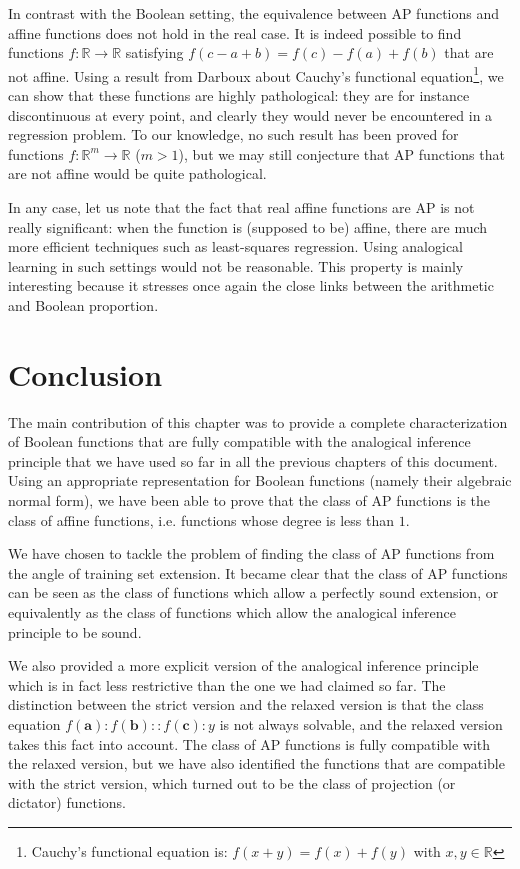 In contrast with the Boolean setting, the equivalence between AP functions and
affine functions does not hold in the real case. It is indeed possible to find
functions $f: \mathbb{R} \to \mathbb{R}$ satisfying $f(c - a + b) = f(c) - f(a)
+ f(b)$ that are not affine. Using a result from Darboux \cite{RadRadAnd09}
about Cauchy's functional equation\footnote{Cauchy's functional equation is:
$f(x + y) = f(x) + f(y)$ with $x, y \in \mathbb{R}$}, we can show that these
functions are highly pathological: they are for instance discontinuous at every
point, and clearly they would never be encountered in a regression problem.
To our knowledge, no such result has been proved for functions $f: \mathbb{R}^m
\to \mathbb{R}$ ($m > 1$), but we may still conjecture that AP functions that
are not affine would be quite pathological.

In any case, let us note that the fact that real affine functions are AP is not
really significant: when the function is (supposed to be) affine, there are
much more efficient techniques such as least-squares regression. Using
analogical learning in such settings would not be reasonable. This property is
mainly interesting because it stresses once again the close links between the
arithmetic and Boolean proportion.

\section*{Conclusion}

The main contribution of this chapter was to provide a complete
characterization of Boolean functions that are fully compatible with the
analogical inference principle that we have used so far in all the previous
chapters of this document. Using an appropriate representation for Boolean
functions (namely their algebraic normal form), we have been able to prove that
the class of AP functions is the class of affine functions, i.e. functions
whose degree is less than $1$.

We have chosen to tackle the problem of finding the class of AP functions from the
angle of training set extension. It became clear that the class of AP functions
can be seen as the class of functions which allow  a perfectly sound extension,
or equivalently as the class of functions which allow the analogical inference
principle to be sound.

We also provided a more explicit version of the analogical inference principle
which is in fact less restrictive than the one we had claimed so far. The
distinction between the strict version and the relaxed version is that the
class equation $f(\mathbf{a}) : f(\mathbf{b}) ::f(\mathbf{c}) :y$ is not always
solvable, and the relaxed version takes this fact into account. The class of AP
functions is fully compatible with the relaxed version, but we have also
identified the functions that are compatible with the strict version, which
turned out to be the class of projection (or dictator) functions.

